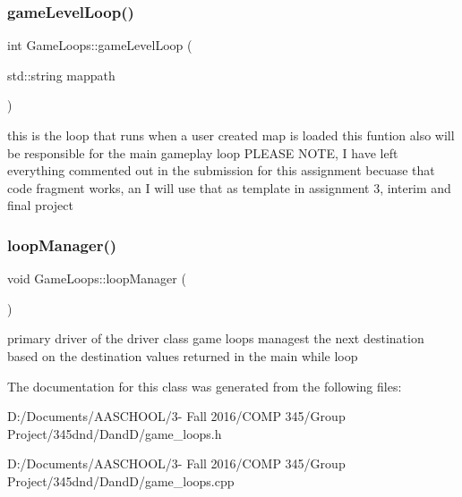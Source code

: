 \subsubsection{\texorpdfstring{game\+Level\+Loop()}{gameLevelLoop()}}
{\footnotesize\ttfamily int Game\+Loops\+::game\+Level\+Loop (\begin{DoxyParamCaption}\item[{std\+::string}]{mappath }\end{DoxyParamCaption})}

this is the loop that runs when a user created map is loaded this funtion also will be responsible for the main gameplay loop P\+L\+E\+A\+SE N\+O\+TE, I have left everything commented out in the submission for this assignment becuase that code fragment works, an I will use that as template in assignment 3, interim and final project \hypertarget{class_game_loops_a8aa13702c60f9e77a7dea9f698556ec0}{}\label{class_game_loops_a8aa13702c60f9e77a7dea9f698556ec0} 
\subsubsection{\texorpdfstring{loop\+Manager()}{loopManager()}}
{\footnotesize\ttfamily void Game\+Loops\+::loop\+Manager (\begin{DoxyParamCaption}{ }\end{DoxyParamCaption})}

primary driver of the driver class game loops managest the next destination based on the destination values returned in the main while loop 

The documentation for this class was generated from the following files\+:\begin{DoxyCompactItemize}
\item 
D\+:/\+Documents/\+A\+A\+S\+C\+H\+O\+O\+L/3-\/ Fall 2016/\+C\+O\+M\+P 345/\+Group Project/345dnd/\+Dand\+D/game\+\_\+loops.\+h\item 
D\+:/\+Documents/\+A\+A\+S\+C\+H\+O\+O\+L/3-\/ Fall 2016/\+C\+O\+M\+P 345/\+Group Project/345dnd/\+Dand\+D/game\+\_\+loops.\+cpp\end{DoxyCompactItemize}
